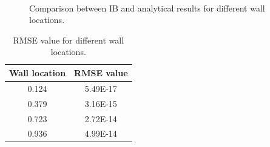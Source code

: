 \begin{figure}[H]
    \centering
    \quad
    \\
    \quad
    \caption{Comparison between IB and analytical results for different wall locations.}
    \label{fig:C3_ghostCell_wallLocation}
\end{figure}
%
%
\begin{table}[H]
\centering
\begin{tabular}{c | c}
     Wall location & RMSE value \\ \hline \hline
     0.124 & 5.49E-17 \\ \hline
     0.379 & 3.16E-15 \\ \hline
     0.723 & 2.72E-14 \\ \hline
     0.936 & 4.99E-14
\end{tabular}
\caption{RMSE value for different wall locations.}
\label{table:C3_ghostCell_wallLocation_RMSE}
\end{table}
